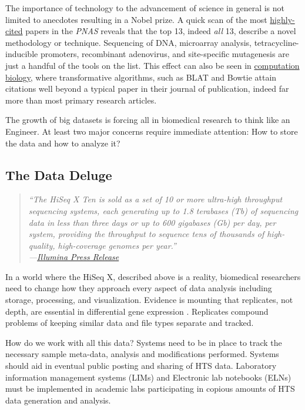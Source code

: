     The importance of technology to the advancement of science in general is not limited to anecdotes resulting in a Nobel prize. A quick scan of the most \href{http://www.pnas.org/reports/most-cited}{highly-cited} papers in the \textit{PNAS} reveals that the top 13, indeed \textit{all} 13, describe a novel methodology or technique. Sequencing of DNA, microarray analysis, tetracycline-inducible promoters, recombinant adenovirus, and site-specific mutagenesis are just a handful of the tools on the list. This effect can also be seen in \href{http://simplystatistics.org/2014/04/07/writing-good-software-can-have-more-impact-than-publishing-in-high-impact-journals-for-genomic-statisticians/}{computation biology}, where transformative algorithms, such as BLAT \citep{Altschul1990} and Bowtie \citep{Langmead2009} attain citations well beyond a typical paper in their journal of publication, indeed far more than most primary research articles.

    The growth of big datasets is forcing all in biomedical research to think like an Engineer. At least two major concerns require immediate attention: How to store the data and how to analyze it?

  \subsection{The Data Deluge}
    \label{Disc:subsec:Dealing with Data Deluge}

    \begin{quote}
      \itshape
      \singlespacing
      ``The HiSeq X Ten is sold as a set of 10 or more ultra-high throughput sequencing systems, each generating up to 1.8 terabases (Tb) of sequencing data in less than three days or up to 600 gigabases (Gb) per day, per system, providing the throughput to sequence tens of thousands of high-quality, high-coverage genomes per year.'' \\
      \indent ---\href{http://bit.ly/PZpegZ}{Illumina Press Release}
      \end{quote}

    In a world where the HiSeq X, described above is a reality, biomedical researchers need to change how they approach every aspect of data analysis including storage, processing, and visualization. Evidence is mounting that replicates, not depth, are essential in differential gene expression \citep{Liu2014}. Replicates compound problems of keeping similar data and file types separate and tracked.

    How do we work with all this data? Systems need to be in place to track the necessary sample meta-data, analysis and modifications performed. Systems should aid in eventual public posting and sharing of HTS data. Laboratory information management systems (LIMs) and Electronic lab notebooks (ELNs) must be implemented in academic labs participating in copious amounts of HTS data generation and analysis.


